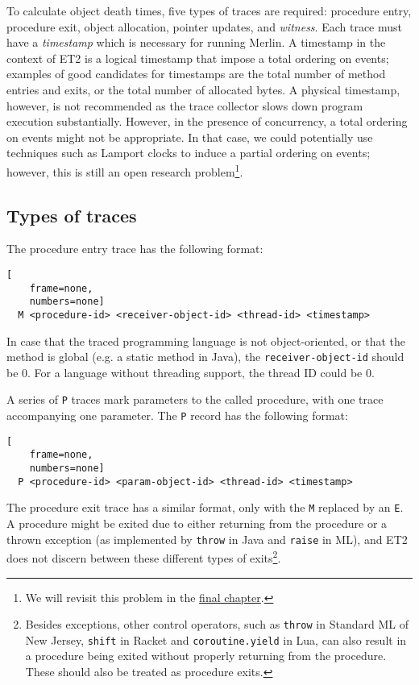 To calculate object death times, five types of traces are required: procedure entry, procedure exit, object allocation, pointer updates, and \emph{witness}. Each trace must have a \emph{timestamp} which is necessary for running Merlin. A timestamp in the context of
ET2 is a logical timestamp that impose a total ordering on events; examples of good candidates for timestamps are the total number of 
method entries and exits, or the total number of allocated bytes. A physical timestamp, however, is not recommended as the trace
collector slows down program execution substantially. However, in the presence of concurrency, a total ordering on events might not be
appropriate. In that case, we could potentially use techniques such as Lamport clocks \citep{LamportClock} to induce a partial ordering
on events; however, this is still an open research problem\footnote{We will revisit this problem in the
\hyperref[chap:conclusion]{final chapter}.}.

\subsection{Types of traces}
The procedure entry trace has the following format:

\begin{lstlisting}[
    frame=none,
    numbers=none]
  M <procedure-id> <receiver-object-id> <thread-id> <timestamp>
\end{lstlisting}

In case that the traced programming language is not object-oriented, or that the method is global (e.g. a static method in Java), the
\lstinline{receiver-object-id} should be 0. For a language without threading support, the thread ID could be 0.

A series of \lstinline{P} traces mark parameters to the called procedure, with one trace accompanying one parameter. The \lstinline{P}
record has the following format:

\begin{lstlisting}[
    frame=none,
    numbers=none]
  P <procedure-id> <param-object-id> <thread-id> <timestamp>
\end{lstlisting}

The procedure exit trace has a similar format, only with the \lstinline{M} replaced by an \lstinline{E}. A procedure might be
exited due to either returning from the procedure or a thrown exception (as implemented by \lstinline{throw} in Java and
\lstinline{raise} in ML), and ET2 does not discern between these different types of exits\footnote{Besides exceptions, other
  control operators, such as \lstinline{throw} in Standard ML of New Jersey, \lstinline{shift} in Racket and
  \lstinline{coroutine.yield} in Lua, can also result in a procedure being exited without properly returning from the procedure. These should
  also be treated as procedure exits.}.

